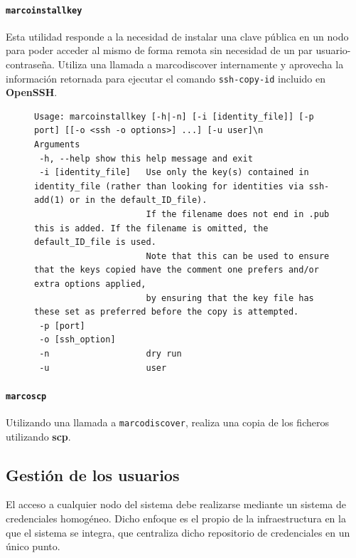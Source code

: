 \paragraph{\texttt{marcoinstallkey}\\}
\label{marcoinstallkey}

Esta utilidad responde a la necesidad de instalar una clave pública en un nodo para poder acceder al mismo de forma remota sin necesidad de un par usuario-contraseña. Utiliza una llamada a marcodiscover internamente y aprovecha la información retornada para ejecutar el comando \texttt{ssh-copy-id} incluido en \textbf{OpenSSH}.

\begin{figure}[H]
\begin{lstlisting}
Usage: marcoinstallkey [-h|-n] [-i [identity_file]] [-p port] [[-o <ssh -o options>] ...] [-u user]\n
Arguments
 -h, --help	show this help message and exit
 -i [identity_file]   Use only the key(s) contained in identity_file (rather than looking for identities via ssh-add(1) or in the default_ID_file).
                      If the filename does not end in .pub this is added. If the filename is omitted, the default_ID_file is used.
                      Note that this can be used to ensure that the keys copied have the comment one prefers and/or extra options applied,
                      by ensuring that the key file has these set as preferred before the copy is attempted.
 -p [port]
 -o [ssh_option]
 -n                   dry run
 -u                   user

\end{lstlisting}
\end{figure}

\paragraph{\texttt{marcoscp}\\}

Utilizando una llamada a \texttt{marcodiscover}, realiza una copia de los ficheros utilizando \textbf{scp}.


\subsection{Gestión de los usuarios}
\label{gestionusuarios}
El acceso a cualquier nodo del sistema debe realizarse mediante un sistema de credenciales homogéneo. Dicho enfoque es el propio de la infraestructura en la que el sistema se integra, que centraliza dicho repositorio de credenciales en un único punto.

